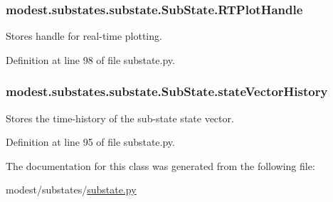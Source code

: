 \subsubsection[{\texorpdfstring{R\+T\+Plot\+Handle}{RTPlotHandle}}]{\setlength{\rightskip}{0pt plus 5cm}modest.\+substates.\+substate.\+Sub\+State.\+R\+T\+Plot\+Handle}\hypertarget{classmodest_1_1substates_1_1substate_1_1SubState_a37ded775b84cea85b4dce0f1b16286c4}{}\label{classmodest_1_1substates_1_1substate_1_1SubState_a37ded775b84cea85b4dce0f1b16286c4}


Stores handle for real-\/time plotting. 



Definition at line 98 of file substate.\+py.

\subsubsection[{\texorpdfstring{state\+Vector\+History}{stateVectorHistory}}]{\setlength{\rightskip}{0pt plus 5cm}modest.\+substates.\+substate.\+Sub\+State.\+state\+Vector\+History}\hypertarget{classmodest_1_1substates_1_1substate_1_1SubState_a38c12c9d0899bc1161f3502b584517a2}{}\label{classmodest_1_1substates_1_1substate_1_1SubState_a38c12c9d0899bc1161f3502b584517a2}


Stores the time-\/history of the sub-\/state state vector. 



Definition at line 95 of file substate.\+py.



The documentation for this class was generated from the following file\+:\begin{DoxyCompactItemize}
\item 
modest/substates/\hyperlink{substate_8py}{substate.\+py}\end{DoxyCompactItemize}
